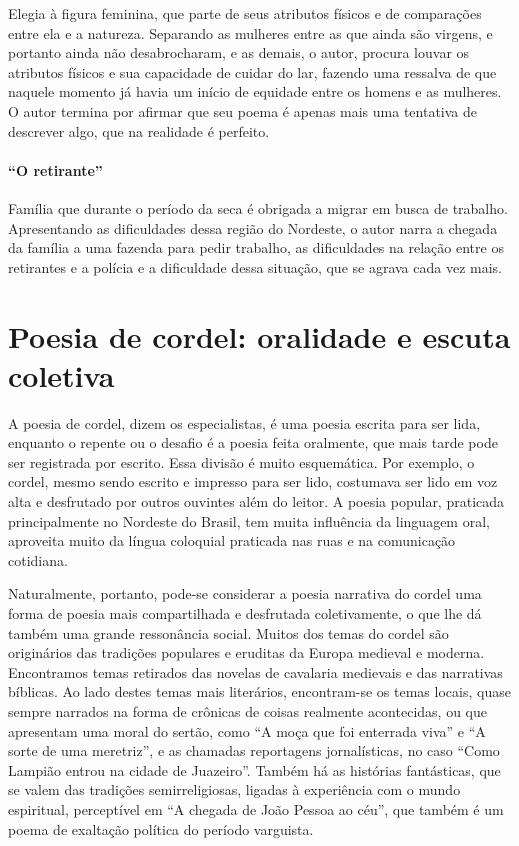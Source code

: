 Elegia à figura feminina, que parte de seus atributos físicos e de
comparações entre ela e a natureza. Separando as mulheres entre as que
ainda são virgens, e portanto ainda não desabrocharam, e as demais, o
autor, procura louvar os atributos físicos e sua capacidade de cuidar
do lar, fazendo uma ressalva de que naquele momento já havia um início
de equidade entre os homens e as mulheres. O autor termina por afirmar
que seu poema é apenas mais uma tentativa de descrever algo, que na
realidade é perfeito. 

\paragraph{``O retirante''}

Família que durante o período da seca é obrigada a migrar em busca de
trabalho. Apresentando as dificuldades dessa região do Nordeste, o
autor narra a chegada da família a uma fazenda para pedir trabalho, as
dificuldades na relação entre os retirantes e a polícia e a
dificuldade dessa situação, que se agrava cada vez mais. 

\pagebreak
\section{Poesia de cordel: oralidade e escuta coletiva}

A poesia de cordel, dizem os especialistas, é uma poesia escrita para
ser lida, enquanto o repente ou o desafio é a poesia feita oralmente,
que mais tarde pode ser registrada por escrito. Essa divisão é muito
esquemática. Por exemplo, o cordel, mesmo sendo escrito e impresso para
ser lido, costumava ser lido em voz alta e desfrutado por outros
ouvintes além do leitor. A poesia popular, praticada principalmente no
Nordeste do Brasil, tem muita influência da linguagem oral, aproveita
muito da língua coloquial praticada nas ruas e na comunicação
cotidiana. 

Naturalmente, portanto, pode-se considerar a poesia narrativa do cordel
uma forma de poesia mais compartilhada e desfrutada coletivamente, o
que lhe dá também uma grande ressonância social. Muitos dos temas do
cordel são originários das tradições populares e eruditas da Europa
medieval e moderna. Encontramos temas retirados das novelas de
cavalaria medievais e das narrativas bíblicas. Ao lado destes temas
mais literários, encontram-se os temas locais, quase sempre narrados na
forma de crônicas de coisas realmente acontecidas, ou que apresentam
uma moral do sertão, como ``A moça que foi enterrada
viva'' e ``A sorte de uma
meretriz'', e as chamadas reportagens jornalísticas,
no caso ``Como Lampião entrou na cidade de
Juazeiro''. Também há as histórias fantásticas, que
se valem das tradições semirreligiosas, ligadas à experiência com o
mundo espiritual, perceptível em ``A chegada de João
Pessoa ao céu'', que também é um poema de exaltação
política do período varguista. 

